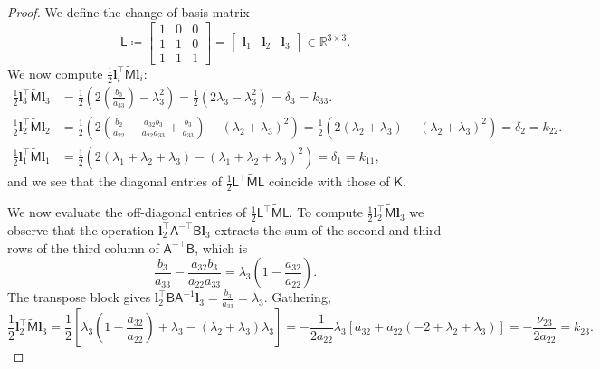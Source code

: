 \documentclass{amsart}
\newcommand{\Real}{\mathbb{R}}
\newcommand{\msfA}{\mathsf{A}}
\newcommand{\msfB}{\mathsf{B}}
\newcommand{\msfM}{\mathsf{M}}
\newcommand{\msfK}{\mathsf{K}}
\newcommand{\msfL}{\mathsf{L}}
\newcommand{\bfl}{\boldsymbol{l}}
\theoremstyle{definition}
\begin{document}
\begin{proof}
  We define the change-of-basis matrix
  \begin{equation*}
    \msfL \coloneqq
    \begin{bmatrix}
      1 & 0 & 0 \\
      1 & 1 & 0 \\
      1 & 1 & 1
    \end{bmatrix}
    = \begin{bmatrix}
        \bfl_1 & \bfl_2 & \bfl_3
      \end{bmatrix} \in \Real^{3 \times 3}.
  \end{equation*}
  We now compute $\frac{1}{2} \bfl_i^\top \tilde{\msfM} \bfl_i$:
  \begin{align*}
    \frac{1}{2} \bfl_3^\top \tilde{\msfM} \bfl_3 &= \frac{1}{2} \left( 2\left(\frac{b_3}{a_{33}}\right) - \lambda_3^2 \right) = \frac{1}{2}(2\lambda_3 - \lambda_3^2) = \delta_3 = k_{33}. \\
    \frac{1}{2} \bfl_2^\top \tilde{\msfM} \bfl_2 &= \frac{1}{2} \left( 2\left( \frac{b_2}{a_{22}} - \frac{a_{32}b_3}{a_{22}a_{33}} + \frac{b_3}{a_{33}} \right) - (\lambda_2+\lambda_3)^2 \right) = \frac{1}{2} \left( 2(\lambda_2+\lambda_3) - (\lambda_2+\lambda_3)^2 \right) = \delta_2 = k_{22}. \\
    \frac{1}{2} \bfl_1^\top \tilde{\msfM} \bfl_1 &= \frac{1}{2} \left( 2(\lambda_1+\lambda_2+\lambda_3) - (\lambda_1+\lambda_2+\lambda_3)^2 \right) = \delta_1 = k_{11},
  \end{align*}
  and we see that the diagonal entries of $\frac12\msfL^\top \tilde{\msfM} \msfL$ coincide with those of $\msfK$.
  
  We now evaluate the off-diagonal entries of $\frac12\msfL^\top \tilde{\msfM} \msfL$. To compute $\frac{1}{2} \bfl_2^\top \tilde{\msfM} \bfl_3$ we observe that the operation $\bfl_2^\top \msfA^{-\top} \msfB \bfl_3$ extracts the sum of the second and third rows of the third column of $\msfA^{-\top}\msfB$, which is 
  \[
    \frac{b_3}{a_{33}} - \frac{a_{32}b_3}{a_{22}a_{33}} = \lambda_3\left(1 - \frac{a_{32}}{a_{22}}\right).
  \]
  The transpose block gives $\bfl_2^\top \msfB \msfA^{-1} \bfl_3 = \frac{b_3}{a_{33}} = \lambda_3$. Gathering,
  \[
    \frac{1}{2} \bfl_2^\top \tilde{\msfM} \bfl_3 = \frac{1}{2} \left[ \lambda_3 \left(1 - \frac{a_{32}}{a_{22}}\right) + \lambda_3 - (\lambda_2 + \lambda_3)\lambda_3 \right] 
    = -\frac{1}{2a_{22}} \lambda_3 \left[ a_{32} + a_{22}(-2 + \lambda_2 + \lambda_3) \right] = -\frac{\nu_{23}}{2a_{22}} = k_{23}.
  \]


\end{proof}
\end{document}
